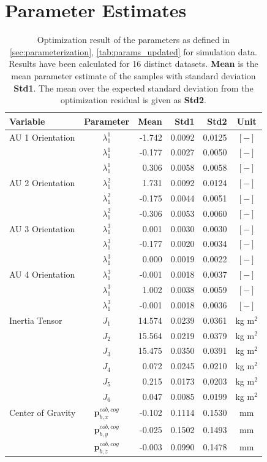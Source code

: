 \section{Parameter Estimates}
\label{sec:app_parameter_est}
\begin{table}[H]
\captionsetup{width=0.9\textwidth}
\centering
\caption{Optimization result of the parameters as defined in \cref{sec:parameterization}, \cref{tab:params_updated} for simulation data. Results have been calculated for 16 distinct datasets. \textbf{Mean} is the mean parameter estimate of the samples with standard deviation \textbf{Std1}. The mean over the expected standard deviation from the optimization residual is given as \textbf{Std2}.}
\begin{tabular}{lcrrrc}
Variable & Parameter & Mean & Std1 & Std2 & Unit \\
\hline \hline
AU 1 Orientation & $\lambda_1^1$ & -1.742 & 0.0092 & 0.0125 & $[-]$ \\
                 & $\lambda_1^1$ & -0.177 & 0.0027 & 0.0050 & $[-]$ \\
                 & $\lambda_1^1$ &  0.306 & 0.0058 & 0.0058 & $[-]$ \\
AU 2 Orientation & $\lambda_1^2$ &  1.731 & 0.0092 & 0.0124 & $[-]$ \\
                 & $\lambda_1^2$ & -0.175 & 0.0044 & 0.0051 & $[-]$ \\
                 & $\lambda_1^2$ & -0.306 & 0.0053 & 0.0060 & $[-]$ \\
AU 3 Orientation & $\lambda_1^3$ &  0.001 & 0.0030 & 0.0030 & $[-]$ \\
                 & $\lambda_1^3$ & -0.177 & 0.0020 & 0.0034 & $[-]$ \\
                 & $\lambda_1^3$ &  0.000 & 0.0019 & 0.0022 & $[-]$ \\
AU 4 Orientation & $\lambda_1^3$ & -0.001 & 0.0018 & 0.0037 & $[-]$ \\
                 & $\lambda_1^3$ &  1.002 & 0.0038 & 0.0059 & $[-]$ \\
                 & $\lambda_1^3$ & -0.001 & 0.0018 & 0.0036 & $[-]$ \\
\hline
Inertia Tensor & $J_1$ & 14.574 & 0.0239 & 0.0361 & kg m$^2$ \\
               & $J_2$ & 15.564 & 0.0219 & 0.0379 & kg m$^2$ \\
               & $J_3$ & 15.475 & 0.0350 & 0.0391 & kg m$^2$ \\
               & $J_4$ &  0.072 & 0.0245 & 0.0210 & kg m$^2$ \\
               & $J_5$ &  0.215 & 0.0173 & 0.0203 & kg m$^2$ \\
               & $J_6$ &  0.047 & 0.0085 & 0.0199 & kg m$^2$ \\
\hline
Center of Gravity & $\mathbf{p}_{b,x}^{cob,cog}$ & -0.102 & 0.1114 & 0.1530 & mm \\
                  & $\mathbf{p}_{b,y}^{cob,cog}$ & -0.025 & 0.1502 & 0.1493 & mm \\
                  & $\mathbf{p}_{b,z}^{cob,cog}$ & -0.003 & 0.0990 & 0.1478 & mm \\
\hline
\end{tabular}
\end{table}

